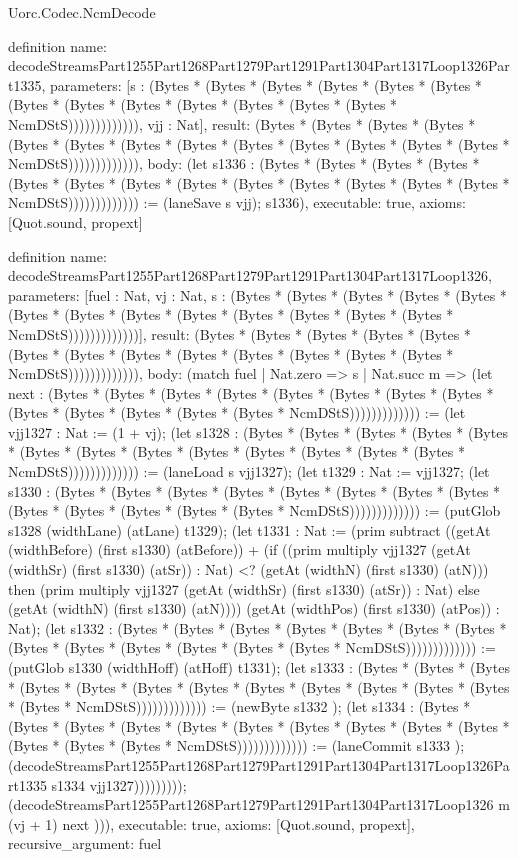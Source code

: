 \begin{lexlean}{Uorc.Codec.NcmDecode}
\begin{semanticmodule}
definition{
  name: decodeStreamsPart1255Part1268Part1279Part1291Part1304Part1317Loop1326Part1335,
  parameters: [s : (Bytes * (Bytes * (Bytes * (Bytes * (Bytes * (Bytes * (Bytes * (Bytes * (Bytes * (Bytes * (Bytes * (Bytes * (Bytes * NcmDStS))))))))))))), vjj : Nat],
  result: (Bytes * (Bytes * (Bytes * (Bytes * (Bytes * (Bytes * (Bytes * (Bytes * (Bytes * (Bytes * (Bytes * (Bytes * (Bytes * NcmDStS))))))))))))),
  body: (let s1336 : (Bytes * (Bytes * (Bytes * (Bytes * (Bytes * (Bytes * (Bytes * (Bytes * (Bytes * (Bytes * (Bytes * (Bytes * (Bytes * NcmDStS))))))))))))) := (laneSave s vjj); s1336),
  executable: true,
  axioms: [Quot.sound, propext]
}

definition{
  name: decodeStreamsPart1255Part1268Part1279Part1291Part1304Part1317Loop1326,
  parameters: [fuel : Nat, vj : Nat, s : (Bytes * (Bytes * (Bytes * (Bytes * (Bytes * (Bytes * (Bytes * (Bytes * (Bytes * (Bytes * (Bytes * (Bytes * (Bytes * NcmDStS)))))))))))))],
  result: (Bytes * (Bytes * (Bytes * (Bytes * (Bytes * (Bytes * (Bytes * (Bytes * (Bytes * (Bytes * (Bytes * (Bytes * (Bytes * NcmDStS))))))))))))),
  body: (match fuel
    | Nat.zero => s
    | Nat.succ m => (let next : (Bytes * (Bytes * (Bytes * (Bytes * (Bytes * (Bytes * (Bytes * (Bytes * (Bytes * (Bytes * (Bytes * (Bytes * (Bytes * NcmDStS))))))))))))) := (let vjj1327 : Nat := (1 + vj); (let s1328 : (Bytes * (Bytes * (Bytes * (Bytes * (Bytes * (Bytes * (Bytes * (Bytes * (Bytes * (Bytes * (Bytes * (Bytes * (Bytes * NcmDStS))))))))))))) := (laneLoad s vjj1327); (let t1329 : Nat := vjj1327; (let s1330 : (Bytes * (Bytes * (Bytes * (Bytes * (Bytes * (Bytes * (Bytes * (Bytes * (Bytes * (Bytes * (Bytes * (Bytes * (Bytes * NcmDStS))))))))))))) := (putGlob s1328 (widthLane) (atLane) t1329); (let t1331 : Nat := (prim subtract ((getAt (widthBefore) (first s1330) (atBefore)) + (if ((prim multiply vjj1327 (getAt (widthSr) (first s1330) (atSr)) : Nat) <? (getAt (widthN) (first s1330) (atN))) then (prim multiply vjj1327 (getAt (widthSr) (first s1330) (atSr)) : Nat) else (getAt (widthN) (first s1330) (atN)))) (getAt (widthPos) (first s1330) (atPos)) : Nat); (let s1332 : (Bytes * (Bytes * (Bytes * (Bytes * (Bytes * (Bytes * (Bytes * (Bytes * (Bytes * (Bytes * (Bytes * (Bytes * (Bytes * NcmDStS))))))))))))) := (putGlob s1330 (widthHoff) (atHoff) t1331); (let s1333 : (Bytes * (Bytes * (Bytes * (Bytes * (Bytes * (Bytes * (Bytes * (Bytes * (Bytes * (Bytes * (Bytes * (Bytes * (Bytes * NcmDStS))))))))))))) := (newByte s1332 ); (let s1334 : (Bytes * (Bytes * (Bytes * (Bytes * (Bytes * (Bytes * (Bytes * (Bytes * (Bytes * (Bytes * (Bytes * (Bytes * (Bytes * NcmDStS))))))))))))) := (laneCommit s1333 ); (decodeStreamsPart1255Part1268Part1279Part1291Part1304Part1317Loop1326Part1335 s1334 vjj1327))))))))); (decodeStreamsPart1255Part1268Part1279Part1291Part1304Part1317Loop1326 m (vj + 1) next ))),
  executable: true,
  axioms: [Quot.sound, propext],
  recursive_argument: fuel
}


\end{semanticmodule}
\end{lexlean}
